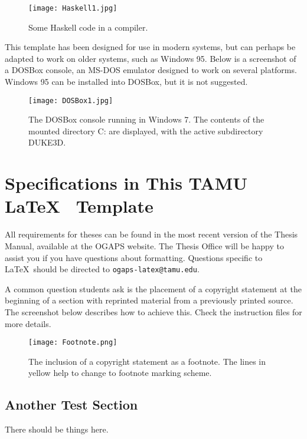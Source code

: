 \begin{figure}[!ht]
\centering
	\texttt{[image: Haskell1.jpg]}
	\caption{Some Haskell code in a compiler.}
\end{figure}

This template has been designed for use in modern systems, but can perhaps be adapted to work on older systems, such as Windows 95. Below is a screenshot of a DOSBox console, an MS-DOS emulator designed to work on several platforms. Windows 95 can be installed into DOSBox, but it is not suggested.

\begin{figure}[ht!]
\centering
	\texttt{[image: DOSBox1.jpg]}
	\caption{The DOSBox console running in Windows 7. The contents of the mounted directory C: are displayed, with the active subdirectory DUKE3D.}
\end{figure}

\section{Specifications in This TAMU \LaTeX ~ Template}

All requirements for theses can be found in the most recent version of the Thesis Manual, available at the OGAPS website. The Thesis Office will be happy to assist you if you have questions about formatting. Questions specific to \LaTeX\ should be directed to \texttt{ogaps-latex@tamu.edu}.

A common question students ask is the placement of a copyright statement at the beginning of a section with reprinted material from a previously printed source. The screenshot below describes how to achieve this. Check the instruction files for more details.

\begin{figure}[ht!]
\centering
	\texttt{[image: Footnote.png]}
	\caption{The inclusion of a copyright statement as a footnote. The lines in yellow help to change to footnote marking scheme.}
\end{figure}

\subsection{Another Test Section}
There should be things here.


